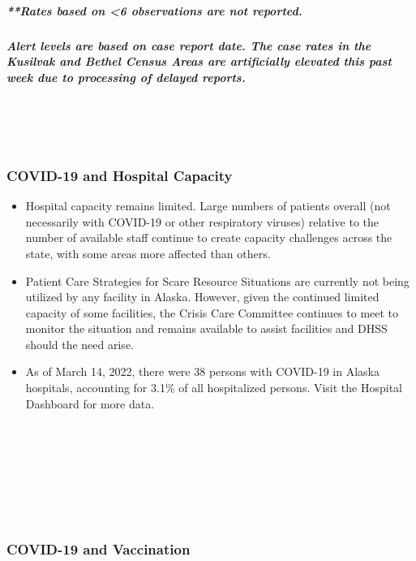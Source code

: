 \documentclass[
]{article}
\begin{document}
\hypertarget{rates-based-on-6-observations-are-not-reported.}{%
\subparagraph{**Rates based on \textless6 observations are not
reported.}\label{rates-based-on-6-observations-are-not-reported.}}

\hypertarget{alert-levels-are-based-on-case-report-date.-the-case-rates-in-the-kusilvak-and-bethel-census-areas-are-artificially-elevated-this-past-week-due-to-processing-of-delayed-reports.}{%
\subparagraph{Alert levels are based on case report date. The case rates
in the Kusilvak and Bethel Census Areas are artificially elevated this
past week due to processing of delayed
reports.}\label{alert-levels-are-based-on-case-report-date.-the-case-rates-in-the-kusilvak-and-bethel-census-areas-are-artificially-elevated-this-past-week-due-to-processing-of-delayed-reports.}}

~

~

\hypertarget{covid-19-and-hospital-capacity}{%
\subsubsection{COVID-19 and Hospital
Capacity}\label{covid-19-and-hospital-capacity}}

\begin{itemize}
\item
  Hospital capacity remains limited. Large numbers of patients overall
  (not necessarily with COVID-19 or other respiratory viruses) relative
  to the number of available staff continue to create capacity
  challenges across the state, with some areas more affected than
  others.
\item
  Patient Care Strategies for Scare Resource Situations are currently
  not being utilized by any facility in Alaska. However, given the
  continued limited capacity of some facilities, the Crisis Care
  Committee continues to meet to monitor the situation and remains
  available to assist facilities and DHSS should the need arise.
\item
  As of March 14, 2022, there were 38 persons with COVID-19 in Alaska
  hospitals, accounting for 3.1\% of all hospitalized persons. Visit the
  Hospital Dashboard for more data.
\end{itemize}

~

~

~

~

\hypertarget{covid-19-and-vaccination}{%
\subsubsection{COVID-19 and
Vaccination}\label{covid-19-and-vaccination}}
\end{document}
